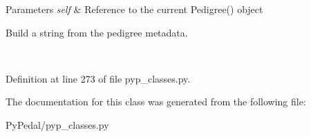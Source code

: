 \begin{DoxyParams}{Parameters}
{\em self} & Reference to the current Pedigree() object \begin{DoxyVerb}Build a string from the pedigree metadata.\end{DoxyVerb}
 \\
\hline
\end{DoxyParams}


Definition at line 273 of file pyp\_\-classes.py.



The documentation for this class was generated from the following file:\begin{DoxyCompactItemize}
\item 
PyPedal/pyp\_\-classes.py\end{DoxyCompactItemize}
